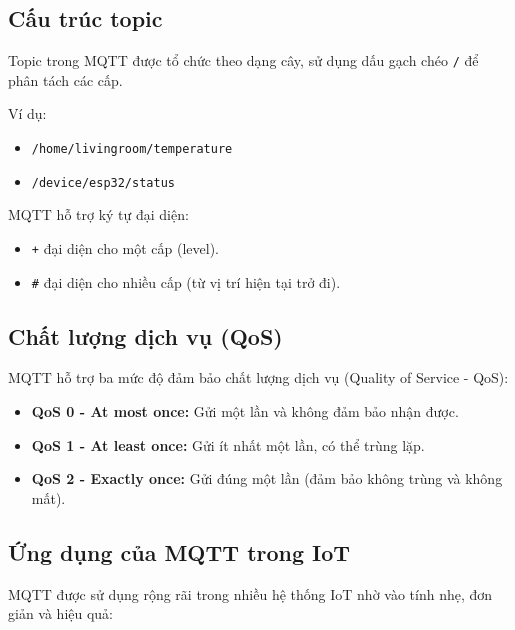 \subsection{Cấu trúc topic}

Topic trong MQTT được tổ chức theo dạng cây, sử dụng dấu gạch chéo \texttt{/} để phân tách các cấp.

Ví dụ:
\begin{itemize}
    \item \texttt{/home/livingroom/temperature}
    \item \texttt{/device/esp32/status}
\end{itemize}

MQTT hỗ trợ ký tự đại diện:
\begin{itemize}
    \item \texttt{+} đại diện cho một cấp (level).
    \item \texttt{\#} đại diện cho nhiều cấp (từ vị trí hiện tại trở đi).
\end{itemize}

\subsection{Chất lượng dịch vụ (QoS)}

MQTT hỗ trợ ba mức độ đảm bảo chất lượng dịch vụ (Quality of Service - QoS):

\begin{itemize}
    \item \textbf{QoS 0 - At most once:} Gửi một lần và không đảm bảo nhận được.
    \item \textbf{QoS 1 - At least once:} Gửi ít nhất một lần, có thể trùng lặp.
    \item \textbf{QoS 2 - Exactly once:} Gửi đúng một lần (đảm bảo không trùng và không mất).
\end{itemize}

\subsection{Ứng dụng của MQTT trong IoT}

MQTT được sử dụng rộng rãi trong nhiều hệ thống IoT nhờ vào tính nhẹ, đơn giản và hiệu quả:

